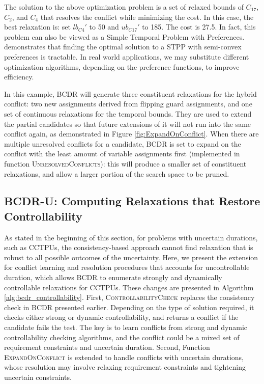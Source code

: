 \documentclass[jair,twoside,11pt,theapa]{article}
\begin{document}
The solution to the above optimization problem is a set of relaxed bounds of
$C_{17}$, $C_2$, and $C_4$ that resolves the conflict while minimizing the cost.
In this case, the best relaxation is: set $lb_{C4}'$ to 50 and $ub_{C17}'$ to
185. The cost is 27.5. In fact, this problem can also be viewed as a Simple
Temporal Problem with Preferences. 
demonstrates that finding the optimal solution to a STPP with semi-convex
preferences is tractable. In real world applications, we may substitute
different optimization algorithms, depending on the preference functions, to
improve efficiency.


In this example, BCDR will generate three constituent relaxations for the hybrid
conflict: two new assignments derived from flipping guard assignments, and one
set of continuous relaxations for the temporal bounds. They are used to extend
the partial candidates so that future extensions of it will not run into the same
conflict again, as demonstrated in Figure \ref{fig:ExpandOnConflict}. When there are multiple unresolved conflicts for a candidate, BCDR is set to expand on the conflict with the least amount of variable assignments first (implemented in function \textsc{UnresolvedConflicts}): this will produce a smaller set of constituent relaxations, and allow a larger portion of the search space to be pruned.


\subsection{BCDR-U: Computing Relaxations that Restore Controllability}


As stated in the beginning of this section, for problems with uncertain
durations, such as CCTPUs, the consistency-based approach cannot find relaxation
that is robust to all possible outcomes of the uncertainty. Here, we
present the extension for conflict learning and resolution procedures that
accounts for uncontrollable duration, which allows BCDR to enumerate strongly
and dynamically controllable relaxations for CCTPUs. These changes are presented in Algorithm \ref{alg:bcdr_controllability}. First, \textsc{ControllabilityCheck} replaces the consistency check in BCDR
presented earlier. Depending on the type of solution required, it checks either
strong or dynamic controllability, and returns a conflict if the candidate
fails the test. The key is to learn conflicts from strong and dynamic
controllability checking algorithms, and the conflict could be a mixed set of
requirement constraints and uncertain duration. Second, Function
\textsc{ExpandOnConflict} is extended to handle conflicts with uncertain
durations, whose resolution may involve relaxing requirement constraints and
tightening uncertain constraints.
\end{document}
